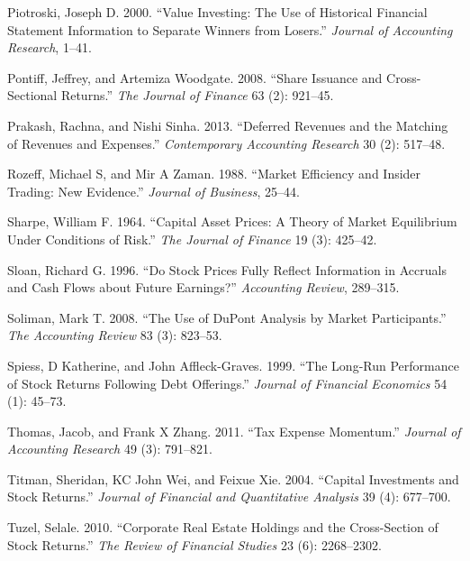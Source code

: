 \documentclass[
  letterpaper,
  DIV=11,
  numbers=noendperiod]{scrreprt}
\newlength{\cslhangindent}
\newlength{\cslentryspacingunit} %
\newenvironment{CSLReferences}[2] %
 {%
  \setlength{\parindent}{0pt}
  \ifodd #1
  \let\oldpar\par
  \def\par{\hangindent=\cslhangindent\oldpar}
  \fi
  \setlength{\parskip}{#2\cslentryspacingunit}
 }%
 {}
\begin{document}
\begin{CSLReferences}{1}{0}
\leavevmode{}%
Piotroski, Joseph D. 2000. {``Value Investing: The Use of Historical
Financial Statement Information to Separate Winners from Losers.''}
\emph{Journal of Accounting Research}, 1--41.

\leavevmode{}%
Pontiff, Jeffrey, and Artemiza Woodgate. 2008. {``Share Issuance and
Cross-Sectional Returns.''} \emph{The Journal of Finance} 63 (2):
921--45.

\leavevmode{}%
Prakash, Rachna, and Nishi Sinha. 2013. {``Deferred Revenues and the
Matching of Revenues and Expenses.''} \emph{Contemporary Accounting
Research} 30 (2): 517--48.

\leavevmode{}%
Rozeff, Michael S, and Mir A Zaman. 1988. {``Market Efficiency and
Insider Trading: New Evidence.''} \emph{Journal of Business}, 25--44.

\leavevmode{}%
Sharpe, William F. 1964. {``Capital Asset Prices: A Theory of Market
Equilibrium Under Conditions of Risk.''} \emph{The Journal of Finance}
19 (3): 425--42.

\leavevmode{}%
Sloan, Richard G. 1996. {``Do Stock Prices Fully Reflect Information in
Accruals and Cash Flows about Future Earnings?''} \emph{Accounting
Review}, 289--315.

\leavevmode{}%
Soliman, Mark T. 2008. {``The Use of DuPont Analysis by Market
Participants.''} \emph{The Accounting Review} 83 (3): 823--53.

\leavevmode{}%
Spiess, D Katherine, and John Affleck-Graves. 1999. {``The Long-Run
Performance of Stock Returns Following Debt Offerings.''} \emph{Journal
of Financial Economics} 54 (1): 45--73.

\leavevmode{}%
Thomas, Jacob, and Frank X Zhang. 2011. {``Tax Expense Momentum.''}
\emph{Journal of Accounting Research} 49 (3): 791--821.

\leavevmode{}%
Titman, Sheridan, KC John Wei, and Feixue Xie. 2004. {``Capital
Investments and Stock Returns.''} \emph{Journal of Financial and
Quantitative Analysis} 39 (4): 677--700.

\leavevmode{}%
Tuzel, Selale. 2010. {``Corporate Real Estate Holdings and the
Cross-Section of Stock Returns.''} \emph{The Review of Financial
Studies} 23 (6): 2268--2302.


\end{CSLReferences}
\end{document}
